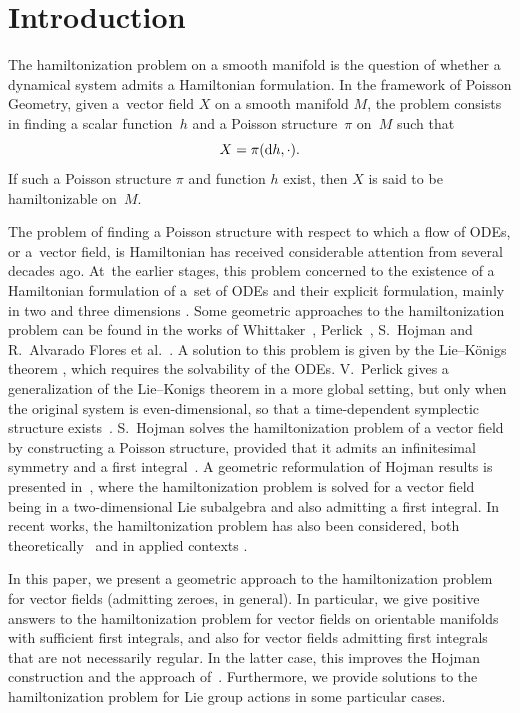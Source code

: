 \documentclass[pdftex]{sigma}%
\newcommand{\dd}{{\rm d}}
\numberwithin{equation}{section}
\begin{document}
\section{Introduction}%

The hamiltonization problem on a smooth manifold is the question of whether a dynamical system admits a Hamiltonian formulation. In the framework of Poisson Geometry, given a~vector field $X$ on a smooth manifold $M$, the problem consists in finding a scalar function~$h$ and a Poisson structure~$\pi$ on~$M$ such that
 \begin{equation}\label{EcIntroHam}
 X = \pi(\dd h, \cdot ).
 \end{equation}
If such a Poisson structure $\pi$ and function $h$ exist, then $X$ is said to be hamiltonizable on~$M$.

The problem of finding a Poisson structure with respect to which a flow of ODEs, or a~vec\-tor field, is Hamiltonian has received considerable attention from several decades ago. At~the earlier stages, this problem concerned to the existence of a Hamiltonian formulation of a~set of ODEs and their explicit formulation, mainly in two and three dimensions \cite{Abar-87,CairoFeix-92,Gumral-Nut,Hern-97,Whittaker}. Some geometric approaches to the hamiltonization problem can be found in the works of Whittaker~\cite{Whittaker}, Perlick~\cite{Perlick-92}, S.~Hojman \cite{Hoj-91,Hojman-96} and R.~Alvarado Flores et al.~\cite{AHA-06}. A solution to this problem is given by the Lie--K\"{o}nigs theorem \cite{Whittaker}, which requires the solvability of the ODEs. V.~Perlick gives a generalization of the Lie--Konigs theorem in a more global setting, but only when the original system is even-dimensional, so that a time-dependent symplectic structure exists~\cite{Perlick-92}. S.~Hojman solves the hamiltonization problem of a vector field by constructing a Poisson structure, provided that it admits an infinitesimal symmetry and a first integral~\cite{Hojman-96}. A geometric reformulation of Hojman results is presented in~\cite{AHA-06}, where the hamiltonization problem is solved for a vector field being in a two-dimensional Lie subalgebra and also admitting a first integral. In recent works, the hamiltonization problem has also been considered, both theoretically~\cite{Kozlov-2020} and in applied contexts \cite{Ballesteros_2020}.

In this paper, we present a geometric approach to the hamiltonization problem for vector fields (admitting zeroes, in general). In particular, we give positive answers to the hamiltonization problem for vector fields on orientable manifolds with sufficient first integrals, and also for vector fields admitting first integrals that are not necessarily regular. In the latter case, this improves the Hojman construction and the approach of~\cite{AHA-06}. Furthermore, we provide solutions to the hamiltonization problem for Lie group actions in some particular cases.
\end{document}
